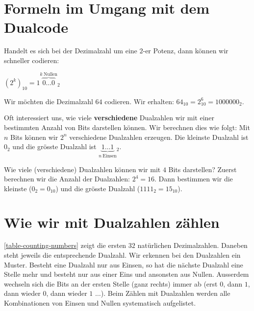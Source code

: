 \section{Formeln im Umgang mit dem Dualcode}

Handelt es sich bei der Dezimalzahl um eine $2$-er Potenz, dann können wir schneller codieren:

\begin{center}
$(2^k)_{10}=1\overbrace{0\dots0}^{k~\textrm{Nullen}}$$_2$
\end{center}

\begin{example}

Wir möchten die Dezimalzahl $64$ codieren. Wir erhalten: $64_{10} = 2^6_{10} = 1000000_2$.

\end{example}

Oft interessiert uns, wie viele \textbf{verschiedene} Dualzahlen wir mit einer bestimmten Anzahl von Bits darstellen können. Wir berechnen dies wie folgt: Mit $n$ Bits können wir $2^n$ verschiedene Dualzahlen erzeugen. Die kleinste Dualzahl ist $0_2$ und die grösste Dualzahl ist $\underbrace{1\dots1}_{n~\textrm{Einsen}}$$_2$.

\begin{example}
Wie viele (verschiedene) Dualzahlen können wir mit $4$ Bits darstellen? Zuerst berechnen wir die Anzahl der Dualzahlen: $2^4 = 16$. Dann bestimmen wir die kleinste ($0_2 = 0_{10}$) und die grösste Dualzahl ($1111_2 = 15_{10}$).
\end{example}

\section{Wie wir mit Dualzahlen zählen}

\autoref{table-counting-numbers} zeigt die ersten $32$ natürlichen Dezimalzahlen. Daneben steht jeweils die entsprechende Dualzahl. Wir erkennen bei den Dualzahlen ein Muster. Besteht eine Dualzahl nur aus Einsen, so hat die nächste Dualzahl eine Stelle mehr und besteht nur aus einer Eins und ansonsten aus Nullen. Ausserdem wechseln sich die Bits an der ersten Stelle (ganz rechts) immer ab (erst $0$, dann $1$, dann wieder $0$, dann wieder $1$ $\dots$). Beim Zählen mit Dualzahlen werden alle Kombinationen von Einsen und Nullen systematisch aufgelistet.


